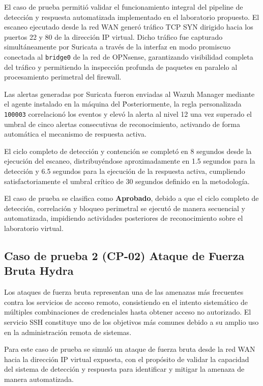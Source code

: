 El caso de prueba permitió validar el funcionamiento integral del pipeline de detección y respuesta automatizada implementado en el 
laboratorio propuesto. El escaneo ejecutado desde la red WAN generó tráfico TCP SYN dirigido hacia los puertos 22 y 80 de la dirección IP 
virtual. Dicho tráfico fue capturado simultáneamente por Suricata a través de la interfaz en modo promiscuo conectada al \texttt{bridge0} 
de la red de OPNsense, garantizando visibilidad completa del tráfico y permitiendo la inspección profunda de paquetes en paralelo al 
procesamiento perimetral del firewall.

Las alertas generadas por Suricata fueron enviadas al Wazuh Manager mediante el agente instalado en la máquina del \IDPS\. Posteriormente, 
la regla personalizada \texttt{100003} correlacionó los eventos y elevó la alerta al nivel 12 una vez superado el umbral de cinco alertas 
consecutivas de reconocimiento, activando de forma automática el mecanismo de respuesta activa.

El ciclo completo de detección y contención se completó en 8 segundos desde la ejecución del escaneo, distribuyéndose aproximadamente en 
1.5 segundos para la detección y 6.5 segundos para la ejecución de la respuesta activa, cumpliendo satisfactoriamente el umbral crítico de 
30 segundos definido en la metodología.

El caso de prueba se clasifica como \textbf{Aprobado}, debido a que el ciclo completo de detección, correlación y bloqueo perimetral se 
ejecutó de manera secuencial y automatizada, impidiendo actividades posteriores de reconocimiento sobre el laboratorio virtual.


\subsection{Caso de prueba 2 (CP-02) Ataque de Fuerza Bruta Hydra}
\noindent

Los ataques de fuerza bruta representan una de las amenazas más frecuentes contra los servicios de acceso remoto, consistiendo en el 
intento sistemático de múltiples combinaciones de credenciales hasta obtener acceso no autorizado. El servicio SSH constituye uno de los 
objetivos más comunes debido a su amplio uso en la administración remota de sistemas.

Para este caso de prueba se simuló un ataque de fuerza bruta desde la red WAN hacia la dirección IP virtual expuesta, con el propósito de 
validar la capacidad del sistema de detección y respuesta para identificar y mitigar la amenaza de manera automatizada.

